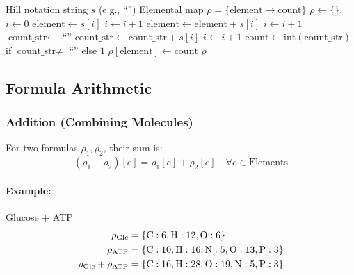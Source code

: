 \begin{algorithm}[htbp]
\caption{Parse Hill notation to elemental map}
\label{alg:parse-formula}
\begin{algorithmic}[1]
\Require Hill notation string $s$ (e.g., ``'')
\Ensure Elemental map $\rho = \{\text{element} \to \text{count}\}$
\State $\rho \gets \{\}$, $i \gets 0$
    \State $\text{element} \gets s[i]$ 
    \State $i \gets i + 1$
        \State $\text{element} \gets \text{element} + s[i]$ 
        \State $i \gets i + 1$
    \EndIf
    \State $\text{count\_str} \gets $ ``''
        \State $\text{count\_str} \gets \text{count\_str} + s[i]$
        \State $i \gets i + 1$
    \EndWhile
    \State $\text{count} \gets \text{int}(\text{count\_str})$ if $\text{count\_str} \neq $ ``'' else $1$
    \State $\rho[\text{element}] \gets \text{count}$
\EndWhile
\State \Return $\rho$
\end{algorithmic}
\end{algorithm}

\subsection{Formula Arithmetic}
\label{subsec:formula-arithmetic}

\subsubsection{Addition (Combining Molecules)}

For two formulas $\rho_1, \rho_2$, their sum is:
\begin{equation}
(\rho_1 + \rho_2)[e] = \rho_1[e] + \rho_2[e] \quad \forall e \in \text{Elements}
\end{equation}

\paragraph{Example:} Glucose + ATP
\begin{align}
\rho_{\text{Glc}} &= \{\ce{C}: 6, \ce{H}: 12, \ce{O}: 6\} \\
\rho_{\text{ATP}} &= \{\ce{C}: 10, \ce{H}: 16, \ce{N}: 5, \ce{O}: 13, \ce{P}: 3\} \\
\rho_{\text{Glc}} + \rho_{\text{ATP}} &= \{\ce{C}: 16, \ce{H}: 28, \ce{O}: 19, \ce{N}: 5, \ce{P}: 3\}
\end{align}


